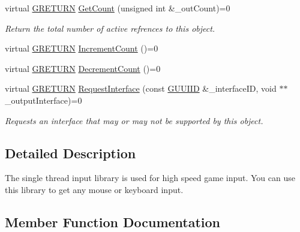 \begin{DoxyCompactItemize}
virtual \hyperlink{namespace_g_w_a69b1aaebac1cac8049825f035884c95b}{G\+R\+E\+T\+U\+RN} \hyperlink{class_g_w_1_1_c_o_r_e_1_1_g_interface_a80f212dcdf60202cf9da49405863d1d5}{Get\+Count} (unsigned int \&\+\_\+out\+Count)=0
\begin{DoxyCompactList}\small\item\em Return the total number of active refrences to this object. \end{DoxyCompactList}\item 
virtual \hyperlink{namespace_g_w_a69b1aaebac1cac8049825f035884c95b}{G\+R\+E\+T\+U\+RN} \hyperlink{class_g_w_1_1_c_o_r_e_1_1_g_interface_a3e04e58eef4f3e3f56ff7fb751194c37}{Increment\+Count} ()=0
\item 
virtual \hyperlink{namespace_g_w_a69b1aaebac1cac8049825f035884c95b}{G\+R\+E\+T\+U\+RN} \hyperlink{class_g_w_1_1_c_o_r_e_1_1_g_interface_af6924e12b14f217b518fc91c63d9703d}{Decrement\+Count} ()=0
\item 
\hypertarget{class_g_w_1_1_c_o_r_e_1_1_g_interface_ab1414aa07bca310a824ee01a91657ad0}{}\label{class_g_w_1_1_c_o_r_e_1_1_g_interface_ab1414aa07bca310a824ee01a91657ad0} 
virtual \hyperlink{namespace_g_w_a69b1aaebac1cac8049825f035884c95b}{G\+R\+E\+T\+U\+RN} \hyperlink{class_g_w_1_1_c_o_r_e_1_1_g_interface_ab1414aa07bca310a824ee01a91657ad0}{Request\+Interface} (const \hyperlink{struct_g_w_1_1_g_u_u_i_i_d}{G\+U\+U\+I\+ID} \&\+\_\+interface\+ID, void $\ast$$\ast$\+\_\+output\+Interface)=0
\begin{DoxyCompactList}\small\item\em Requests an interface that may or may not be supported by this object. \end{DoxyCompactList}\end{DoxyCompactItemize}


\subsection{Detailed Description}
The single thread input library is used for high speed game input. You can use this library to get any mouse or keyboard input. 

\subsection{Member Function Documentation}
\hypertarget{class_g_w_1_1_c_o_r_e_1_1_g_interface_af6924e12b14f217b518fc91c63d9703d}{}\label{class_g_w_1_1_c_o_r_e_1_1_g_interface_af6924e12b14f217b518fc91c63d9703d} 
